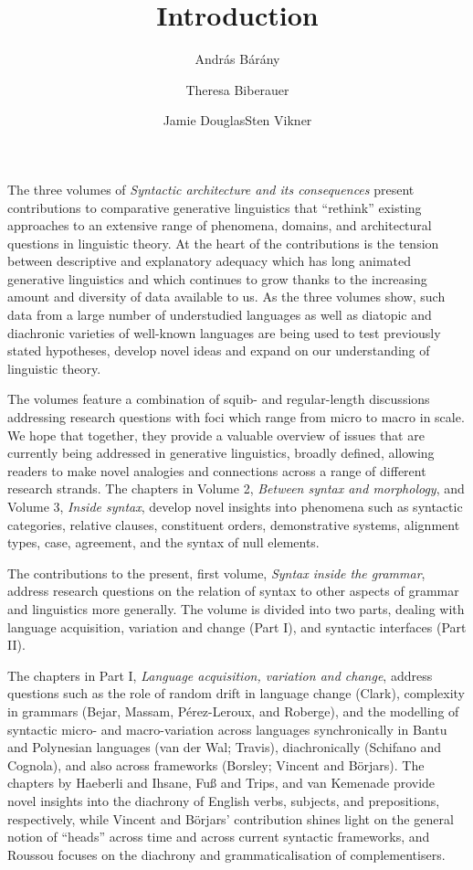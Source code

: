 \documentclass[output=paper]{langsci/langscibook}
\author{András Bárány\affiliation{Leiden University}\and Theresa Biberauer\affiliation{University of Cambridge, Stellenbosch University, University of the West Cape}\and Jamie Douglas\affiliation{University of Cambridge}\lastand Sten Vikner\affiliation{Aarhus University}}
\title{Introduction}
\begin{document}
\noindent The three volumes of \emph{Syntactic architecture and its
consequences} present contributions to comparative generative linguistics that
\enquote{rethink} existing approaches to an extensive range of phenomena,
domains, and architectural questions in linguistic theory. At the heart of the
contributions is the tension between descriptive and explanatory adequacy which
has long animated generative linguistics and which continues to grow thanks to
the increasing amount and diversity of data available to us. As the three
volumes show, such data from a large number of understudied languages as well
as diatopic and diachronic varieties of well-known languages are being used to
test previously stated hypotheses, develop novel ideas and expand on our
understanding of linguistic theory.

The volumes feature a combination of squib- and regular-length discussions
addressing research questions with foci which range from micro to macro in
scale. We hope that together, they provide a valuable overview of issues that
are currently being addressed in generative linguistics, broadly defined,
allowing readers to make novel analogies and connections across a range of
different research strands. The chapters in Volume 2, \emph{Between syntax and
morphology}, and Volume 3, \emph{Inside syntax}, develop novel insights into
phenomena such as syntactic categories, relative clauses, constituent orders,
demonstrative systems, alignment types, case, agreement, and the syntax of null
elements.

The contributions to the present, first volume, \emph{Syntax inside the
grammar}, address research questions on the relation of syntax to other aspects
of grammar and linguistics more generally. The volume is divided into two
parts, dealing with language acquisition, variation and change (Part I), and
syntactic interfaces (Part II).

The chapters in Part I, \emph{Language acquisition, variation and change},
address questions such as the role of random drift in language change (Clark),
complexity in grammars (Bejar, Massam, Pérez-Leroux, and Roberge), and the
modelling of syntactic micro- and macro-variation across languages
synchronically in Bantu and Polynesian languages (van der Wal; Travis),
diachronically (Schifano and Cognola), and also across frameworks (Borsley;
Vincent and Börjars). The chapters by Haeberli and Ihsane, Fuß and Trips, and
van Kemenade provide novel insights into the diachrony of English verbs,
subjects, and prepositions, respectively, while Vincent and Börjars’
contribution shines light on the general notion of \enquote{heads} across time
and across current syntactic frameworks, and Roussou focuses on the diachrony
and grammaticalisation of complementisers.
\end{document}

